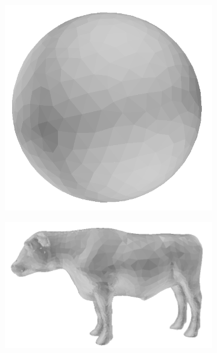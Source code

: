 \begin{figure}[th]
\centering
\begin{subfigure}{.24\textwidth}
  \centering
  \includegraphics[scale=0.12]{Images/ball}
\end{subfigure}%
\begin{subfigure}{.24\textwidth}
  \centering
  \includegraphics[scale=0.12]{Images/cow}
\end{subfigure}
\begin{subfigure}{.24\textwidth}

\end{subfigure}
\end{figure}
